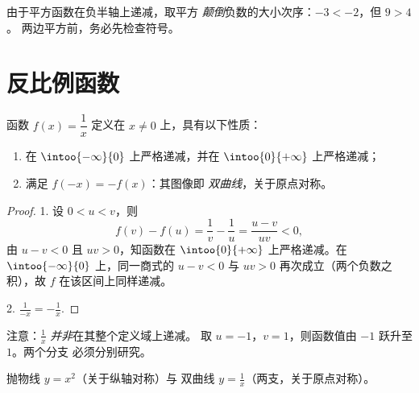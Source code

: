 \begin{remark}[平方与大小关系]
由于平方函数在负半轴上递减，取平方
\emph{颠倒}负数的大小次序：$-3 < -2$，但 $9 > 4$。
两边平方前，务必先检查符号。
\end{remark}

\section{反比例函数}

\begin{proposition}[反比例函数]\label{prop:g10:reffunc:inverse}
函数 $f(x) = \dfrac1x$ 定义在 $x \neq 0$ 上，具有以下性质：
\begin{enumerate}
  \item 在 $\intoo{-\infty}{0}$ 上严格递减，并在
        $\intoo{0}{+\infty}$ 上严格递减；
  \item 满足 $f(-x) = -f(x)$：其图像即
        \emph{双曲线}，关于原点对称。
\end{enumerate}
\end{proposition}

\begin{proof}
1. 设 $0 < u < v$，则
\[
f(v) - f(u) = \frac1v - \frac1u = \frac{u - v}{uv} < 0,
\]
由 $u - v < 0$ 且 $uv > 0$，知函数在
$\intoo{0}{+\infty}$ 上严格递减。在 $\intoo{-\infty}{0}$ 上，同一商式的
$u - v < 0$ 与 $uv > 0$ 再次成立（两个负数之积），故 $f$
在该区间上同样递减。

2. $\frac{1}{-x} = -\frac1x$.
\end{proof}

\begin{remark}
注意：$\frac1x$ \emph{并非}在其整个定义域上递减。
取 $u = -1$，$v = 1$，则函数值由 $-1$ 跃升至 $1$。两个分支
必须分别研究。
\end{remark}

\begin{omfigure}
\hfill
{}

{\small 抛物线 $y = x^2$（关于纵轴对称）与
双曲线 $y = \frac1x$（两支，关于原点对称）。}
\end{omfigure}

